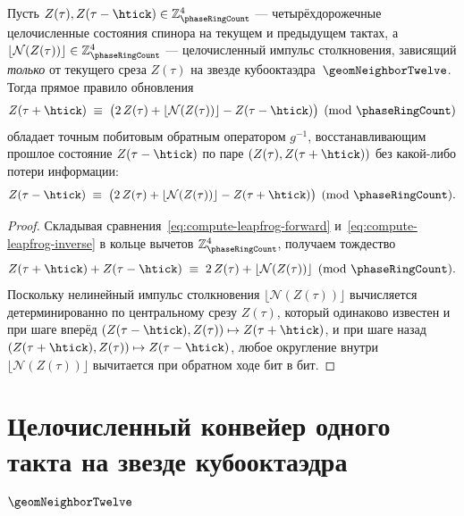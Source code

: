 \begin{theorem}
\label{thm:compute-modular-leapfrog}
Пусть $Z(\tau), Z(\tau-\htick) \in \mathbb{Z}_{\phaseRingCount}^4$ --- четырёхдорожечные целочисленные состояния спинора на текущем и предыдущем тактах, а $\lfloor\mathcal{N}(Z(\tau))\rfloor \in \mathbb{Z}_{\phaseRingCount}^4$ --- целочисленный импульс столкновения, зависящий \emph{только} от текущего среза $Z(\tau)$ на звезде кубооктаэдра~$\geomNeighborTwelve$.
Тогда прямое правило обновления
\begin{equation}
\label{eq:compute-leapfrog-forward}
  Z(\tau + \htick) \;\equiv\; \bigl(2\,Z(\tau) + \lfloor\mathcal{N}(Z(\tau))\rfloor - Z(\tau - \htick)\bigr) \pmod{\phaseRingCount}
\end{equation}
обладает точным побитовым обратным оператором $g^{-1}$, восстанавливающим прошлое состояние $Z(\tau - \htick)$ по паре $(Z(\tau), Z(\tau + \htick))$ без какой-либо потери информации:
\begin{equation}
\label{eq:compute-leapfrog-inverse}
  Z(\tau - \htick) \;\equiv\; \bigl(2\,Z(\tau) + \lfloor\mathcal{N}(Z(\tau))\rfloor - Z(\tau + \htick)\bigr) \pmod{\phaseRingCount}.
\end{equation}
\end{theorem}

\begin{proof}
Складывая сравнения~\eqref{eq:compute-leapfrog-forward} и~\eqref{eq:compute-leapfrog-inverse} в кольце вычетов $\mathbb{Z}_{\phaseRingCount}^4$, получаем тождество
\[
  Z(\tau + \htick) + Z(\tau - \htick) \;\equiv\; 2\,Z(\tau) + \lfloor\mathcal{N}(Z(\tau))\rfloor \pmod{\phaseRingCount}.
\]
Поскольку нелинейный импульс столкновения $\lfloor\mathcal{N}(Z(\tau))\rfloor$ вычисляется детерминированно по центральному срезу $Z(\tau)$, который одинаково известен и при шаге вперёд $(Z(\tau-\htick), Z(\tau))\mapsto Z(\tau+\htick)$, и при шаге назад $(Z(\tau+\htick), Z(\tau))\mapsto Z(\tau-\htick)$, любое округление внутри~$\lfloor\mathcal{N}(Z(\tau))\rfloor$ вычитается при обратном ходе бит в бит.
\end{proof}

\section{Целочисленный конвейер одного такта на звезде кубооктаэдра \texorpdfstring{$\geomNeighborTwelve$}{N12}}
\label{sec:compute-pipeline-tick}

